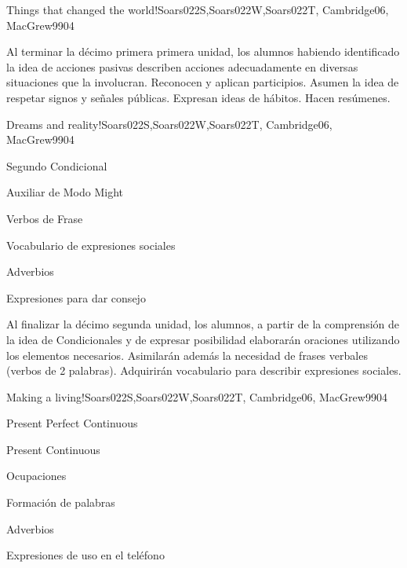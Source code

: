 \begin{syllabus}
\begin{unit}{Things that changed the world!}{Soars022S,Soars022W,Soars022T, Cambridge06, MacGrew99}{0}{4}
   \begin{learningoutcomes}
      \item Al terminar la décimo primera primera unidad, los alumnos habiendo identificado la idea de acciones pasivas describen acciones adecuadamente en diversas situaciones que la involucran. Reconocen y aplican participios. Asumen la idea de respetar signos y señales públicas. Expresan ideas de hábitos. Hacen resúmenes.
   \end{learningoutcomes}
\end{unit}

\begin{unit}{Dreams and reality!}{Soars022S,Soars022W,Soars022T, Cambridge06, MacGrew99}{0}{4}
   \begin{topics}
      \item Segundo Condicional
      \item Auxiliar de Modo Might
      \item Verbos de Frase
      \item Vocabulario de expresiones sociales
      \item Adverbios
      \item Expresiones para dar consejo
   \end{topics}

   \begin{learningoutcomes}
      \item Al finalizar la décimo segunda unidad, los alumnos, a partir de la comprensión de la idea de Condicionales y de expresar posibilidad elaborarán oraciones utilizando los elementos necesarios. Asimilarán además la necesidad de frases verbales (verbos de 2 palabras). Adquirirán vocabulario para describir expresiones sociales.
   \end{learningoutcomes}
\end{unit}

\begin{unit}{Making a living!}{Soars022S,Soars022W,Soars022T, Cambridge06, MacGrew99}{0}{4}
   \begin{topics}
      \item Present Perfect Continuous
      \item Present Continuous
      \item Ocupaciones 
      \item Formación de palabras
      \item Adverbios
      \item Expresiones de uso en el teléfono
   \end{topics}


\end{unit}
\end{syllabus}
